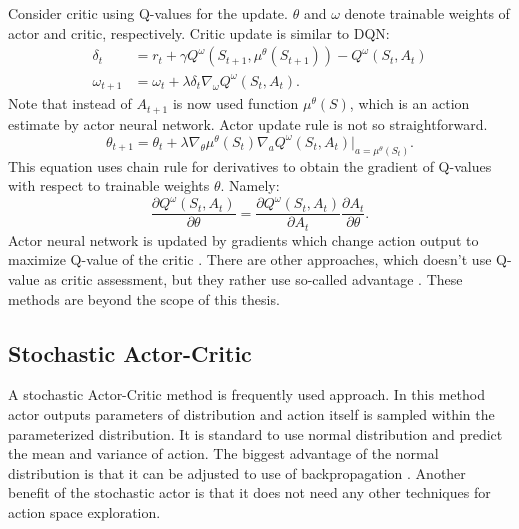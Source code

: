 Consider critic using Q-values for the update. $\theta$ and $\omega$ denote trainable weights of actor and critic, respectively. Critic update is similar to DQN:
\begin{align}
\delta_t &= r_t + \gamma Q^\omega(S_{t+1}, \mu ^\theta (S_{t+1})) - Q^\omega(S_t, A_t)\\
\omega_{t+1} &= \omega_t + \lambda \delta_t \nabla_\omega Q^\omega(S_t, A_t).
\end{align}
Note that instead of $A_{t+1}$ is now used function $\mu^\theta(S)$, which is an action estimate by actor neural network. Actor update rule is not so straightforward. 
\begin{equation}
\theta_{t+1} = \theta_t + \lambda\nabla_\theta \mu^\theta(S_t)\nabla_a Q^\omega (S_t, A_t)|_{a = \mu^\theta(S_t)}.
\end{equation}
This equation uses chain rule for derivatives to obtain the gradient of Q-values with respect to trainable weights $\theta$. Namely:
\begin{equation}
\frac{\partial Q^\omega(S_t, A_t)}{\partial \theta} = \frac{\partial Q^\omega(S_t, A_t)}{\partial A_t} \frac{\partial A_t}{\partial \theta}.
\end{equation}
Actor neural network is updated by gradients which change action output to maximize Q-value of the critic \cite{silver2014}.
There are other approaches, which doesn't use Q-value as critic assessment, but they rather use so-called advantage \cite{schulman2017}. These methods are beyond the scope of this thesis. 

\subsection{Stochastic Actor-Critic}
A stochastic Actor-Critic method is frequently used approach. In this method actor outputs parameters of distribution and action itself is sampled within the parameterized distribution. It is standard to use normal distribution and predict the mean and variance of action. The biggest advantage of the normal distribution is that it can be adjusted to use of backpropagation \cite{hess2015}. Another benefit of the stochastic actor is that it does not need any other techniques for action space exploration.


